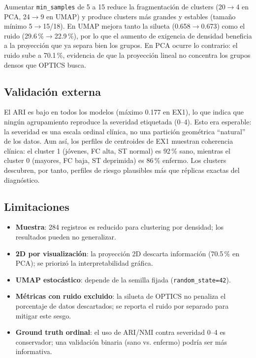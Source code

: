 \documentclass[11pt,a4paper]{article}
\begin{document}
Aumentar \texttt{min\_samples} de 5 a 15 reduce la fragmentación de clusters (20$\rightarrow$4
en PCA, 24$\rightarrow$9 en UMAP) y produce clusters más grandes y estables (tamaño mínimo
5$\rightarrow$15/18). En UMAP mejora tanto la silueta (0.658$\rightarrow$0.673) como el ruido
(29.6\,\%$\rightarrow$22.9\,\%), por lo que el aumento de exigencia de densidad beneficia a
la proyección que ya separa bien los grupos. En PCA ocurre lo contrario: el ruido sube a
70.1\,\%, evidencia de que la proyección lineal no concentra los grupos densos que OPTICS
busca.

\subsection{Validación externa}

El ARI es bajo en todos los modelos (máximo 0.177 en EX1), lo que indica que ningún
agrupamiento reproduce la severidad etiquetada (0--4). Esto era esperable: la severidad es
una escala ordinal clínica, no una partición geométrica ``natural'' de los datos. Aun así,
los perfiles de centroides de EX1 muestran coherencia clínica: el cluster 1 (jóvenes, FC alta,
ST normal) es 92\,\% sano, mientras el cluster 0 (mayores, FC baja, ST deprimida) es 86\,\%
enfermo. Los clusters descubren, por tanto, perfiles de riesgo plausibles más que réplicas
exactas del diagnóstico.

\subsection{Limitaciones}

\begin{itemize}
  \item \textbf{Muestra}: 284 registros es reducido para clustering por densidad; los
        resultados pueden no generalizar.
  \item \textbf{2D por visualización}: la proyección 2D descarta información (70.5\,\% en
        PCA); se priorizó la interpretabilidad gráfica.
  \item \textbf{UMAP estocástico}: depende de la semilla fijada (\texttt{random\_state=42}).
  \item \textbf{Métricas con ruido excluido}: la silueta de OPTICS no penaliza el porcentaje
        de datos descartados; se reporta el ruido por separado para mitigar este sesgo.
  \item \textbf{Ground truth ordinal}: el uso de ARI/NMI contra severidad 0--4 es
        conservador; una validación binaria (sano vs. enfermo) podría ser más informativa.
\end{itemize}
\end{document}
